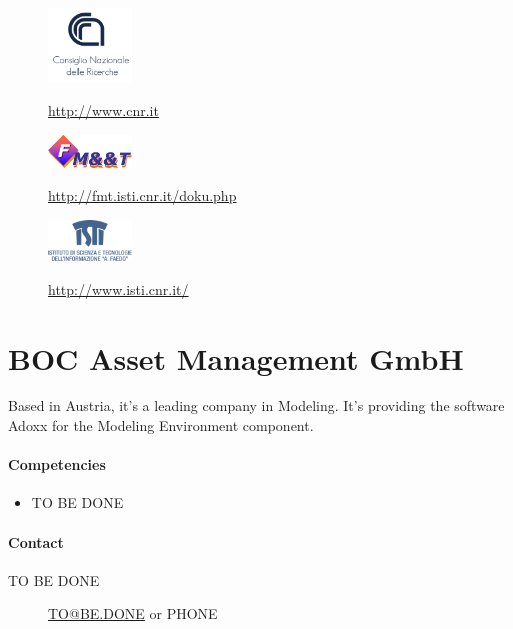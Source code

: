 \documentclass{learnpad}
\begin{document}
\begin{figure}[!htp]
	\centering
	\includegraphics[width=6em,keepaspectratio]{figures/cnr.png}\par
	\url{http://www.cnr.it}
\end{figure}

\begin{figure}[!htp]
	\centering
	\includegraphics[width=6em,keepaspectratio]{figures/fmt.png}\par
	\url{http://fmt.isti.cnr.it/doku.php}
\end{figure}

\begin{figure}[!htp]
	\centering
	\includegraphics[width=6em,keepaspectratio]{figures/isti.png}\par
	\url{http://www.isti.cnr.it/}
\end{figure}

\section{BOC Asset Management GmbH}
Based in Austria, it's a leading company in Modeling.  It's providing the
software Adoxx for the Modeling Environment component.

\paragraph{Competencies}
\begin{itemize}
	\item TO BE DONE
\end{itemize}

\paragraph{Contact}
\begin{description}
	\item[TO BE DONE] \href{mailto:TO@BE.DONE}{TO@BE.DONE} or PHONE
\end{description}
\end{document}
